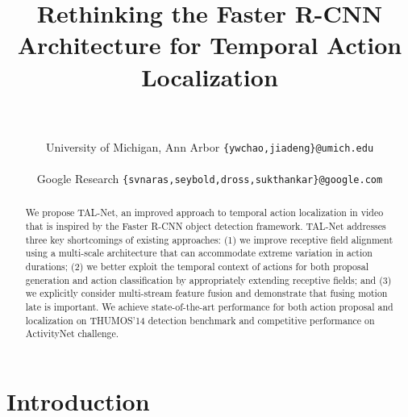 \documentclass[10pt,twocolumn,letterpaper]{article}
\begin{document}
\title{Rethinking the Faster R-CNN Architecture for Temporal Action Localization}

\author{ \vspace{3mm} \\
\begin{minipage}{0.47\textwidth}
 \centering
 University of Michigan, Ann Arbor
 {\tt\small \{ywchao,jiadeng\}@umich.edu}\\
\end{minipage}
\begin{minipage}{0.53\textwidth}
 \centering
 Google Research
 {\tt\small \{svnaras,seybold,dross,sukthankar\}@google.com}\\
\end{minipage}
}

\maketitle


\begin{abstract}
We propose TAL-Net, an improved approach to temporal action localization in
video that is inspired by the Faster R-CNN object detection framework. TAL-Net
addresses three key shortcomings of existing approaches: (1) we improve
receptive field alignment using a multi-scale architecture that can accommodate
extreme variation in action durations; (2) we better exploit the temporal
context of actions for both proposal generation and action classification by
appropriately extending receptive fields; and (3) we explicitly consider
multi-stream feature fusion and demonstrate that fusing motion late is
important. We achieve state-of-the-art performance for both action proposal and
localization on THUMOS'14 detection benchmark and competitive performance on
ActivityNet challenge.
\end{abstract}

\section{Introduction}
\label{sec:intro}
\end{document}
